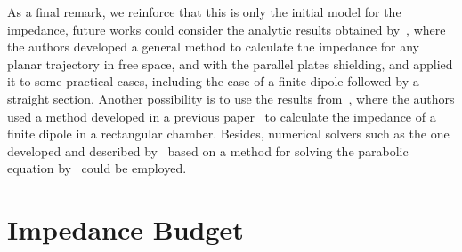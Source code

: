     As a final remark, we reinforce that this is only the initial model for the impedance, future works could consider the analytic results obtained by~, where the authors developed a general method to calculate the impedance for any planar trajectory in free space, and with the parallel plates shielding, and applied it to some practical cases, including the case of a finite dipole followed by a straight section. Another possibility is to use the results from~, where the authors used a method developed in a previous paper~\cite{Stupakov2003} to calculate the impedance of a finite dipole in a rectangular chamber. Besides, numerical solvers such as the one developed and described by~ based on a method for solving the parabolic equation by~ could be employed.


\chapter{Impedance Budget}\label{cap:impedance_budget}


